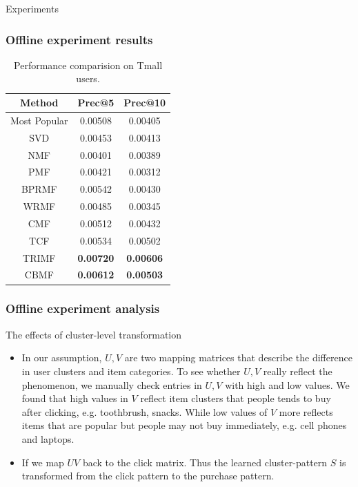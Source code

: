 \documentclass[xetex,mathserif,serif]{beamer}
\begin{document}
\begin{section}{Experiments}
\begin{frame}
\begin{table}
    \end{table}
  \end{frame}
  \begin{frame}
    \frametitle{Offline experiment results}
    \begin{table}
      \centering
      \begin{tabular}{|c|c|c|}
        \hline
        Method&Prec@5&Prec@10\\
        \hline
        Most Popular&0.00508&0.00405\\
        \hline
        SVD&0.00453&0.00413\\
        \hline
        NMF&0.00401&0.00389\\
        \hline
        PMF&0.00421&0.00312\\
        \hline
        BPRMF&0.00542&0.00430\\
        \hline
        WRMF&0.00485&0.00345\\
        \hline
        CMF&0.00512&0.00432\\
        \hline
        TCF&0.00534&0.00502\\
        \hline
        TRIMF&\textbf{\color{red}0.00720}&\textbf{\color{red}0.00606}\\
        \hline
        CBMF&\textbf{0.00612}&\textbf{0.00503}\\
        \hline
      \end{tabular}
      \caption{Performance comparision on Tmall users.}
    \end{table}
  \end{frame}
  \begin{frame}
    \frametitle{Offline experiment analysis}
    \begin{block}{The effects of cluster-level transformation} 
      \begin{itemize}
      \item 
        In our assumption, $U,V$ are two mapping matrices that describe the difference in user clusters and item categories. To see whether $U,V$ really reflect the phenomenon, we manually check entries in $U,V$ with high and low values. We found that high values in $V$ reflect item clusters that people tends to buy after clicking, e.g. toothbrush, snacks. While low values of $V$ more reflects items that are popular but people may not buy immediately, e.g. cell phones and laptops.
      \item If we map $UV$ back to the click matrix. Thus the learned cluster-pattern $S$ is transformed from the click pattern to the purchase pattern.

\end{itemize}
\end{block}
\end{frame}
\end{section}
\end{document}
